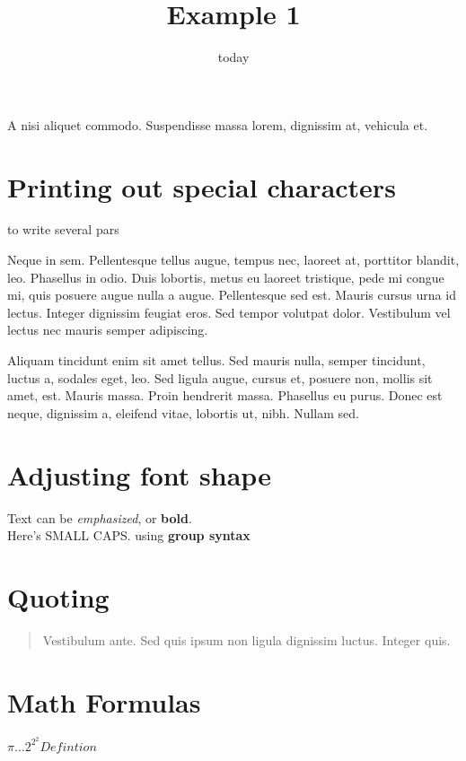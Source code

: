 \documentclass[a4paper,32pt]{article}
\title{Example 1}
\author{\7}
\date{today}
\newcommand{\7}{the m7tkr}
\begin{document}
\maketitle

\noindent A nisi aliquet commodo. Suspendisse massa lorem, dignissim at, vehicula et.

\section{Printing out special characters}

 to write several pars

{\centering \begin{minipage}{10cm}
Neque in sem. Pellentesque tellus augue, tempus nec, laoreet at, porttitor
blandit, leo. Phasellus in odio. Duis lobortis, metus eu laoreet tristique, pede
mi congue mi, quis posuere augue nulla a augue. Pellentesque sed est. Mauris
cursus urna id lectus. Integer dignissim feugiat eros. Sed tempor volutpat
    dolor. Vestibulum vel lectus nec mauris semper adipiscing.\\[1cm]
\end{minipage}

}

Aliquam tincidunt enim sit amet tellus. Sed mauris nulla, semper tincidunt,
luctus a, sodales eget, leo. Sed ligula augue, cursus et, posuere non, mollis
sit amet, est. Mauris massa. Proin hendrerit massa. Phasellus eu purus. Donec
est neque, dignissim a, eleifend vitae, lobortis ut, nibh. Nullam sed.

\section{Adjusting font shape}
Text can be \emph{emphasized}, or \textbf{bold}.\\
Here's \textsc{SMALL CAPS}.
using {\bfseries group syntax}

\section{Quoting}
\begin{quote}
Vestibulum ante. Sed quis ipsum non ligula dignissim luctus. Integer quis.
\end{quote}

\section{Math Formulas}
\begin{math}
    \pi \ldots 2^{2^2} \displaystyle{Defintion}
\end{math}
\end{document}

